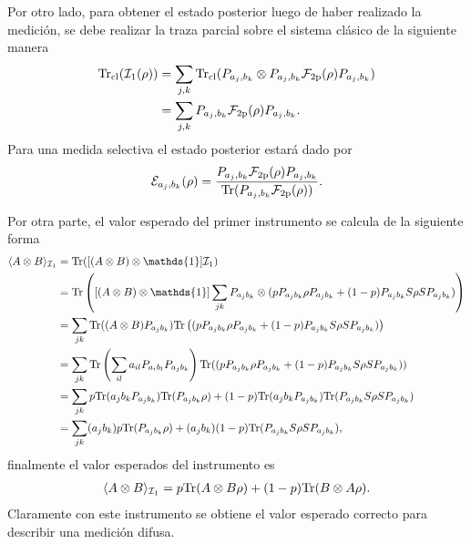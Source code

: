 Por otro lado, para obtener el estado posterior luego de haber realizado la medición, se debe realizar la traza parcial sobre el sistema clásico de la siguiente manera
\begin{equation}\label{eq:traza_cl_1instrument2p}
    \begin{split}
      {\rm Tr}_{\text{cl}}(\mathcal{I}_1{(\rho)})&=\sum_{j,k}{\rm Tr}_{\text{cl}}(P_{a_j,b_k}\otimes P_{a_j,b_k} \mathcal{F}_{2\text{p}}(\rho) P_{a_j,b_k})\\
    &=\sum_{j,k}P_{a_j,b_k} \mathcal{F}_{2\text{p}}(\rho) P_{a_j,b_k}.
\end{split}
\end{equation}Para una medida selectiva el estado posterior estará dado por
\[\mathcal{E}_{a_j,b_k}(\rho)=\dfrac{P_{a_j,b_k} \mathcal{F}_{2\text{p}}(\rho) P_{a_j,b_k}}{{\rm Tr}(P_{a_j,b_k} \mathcal{F}_{2\text{p}}(\rho))}.\]



Por otra parte, el valor esperado del primer instrumento se calcula de la siguiente forma \begin{equation*}
    \begin{split}
        \la A\otimes B \ra_{\mathcal{I}_1}&=\tr([(A\otimes B) \otimes \mathds{1}]\mathcal{I}_1) \\
        &=\tr\left([(A\otimes B) \otimes \mathds{1}]\sum_{jk}P_{a_j b_k}\otimes (pP_{a_j b_k}\rho P_{a_j b_k}+ (1-p)P_{a_j b_k}S\rho S P_{a_j b_k})\right)\\
        &=\sum_{jk} \tr((A\otimes B) P_{a_j b_k}) \tr\left((pP_{a_j b_k}\rho P_{a_j b_k}+ (1-p)P_{a_j b_k}S\rho S P_{a_j b_k})\right) \\
        &=\sum_{jk} \tr\left(\sum_{il}a_{il}P_{a_i b_l} P_{a_j b_k}\right) \tr((pP_{a_j b_k}\rho P_{a_j b_k}+ (1-p)P_{a_j b_k}S\rho S P_{a_j b_k})) \\
        &=\sum_{jk} p\tr(a_{j}b_k P_{a_j b_k}) \tr(P_{a_j b_k}\rho)+ (1-p)\tr(a_{j}b_k P_{a_j b_k})\tr(P_{a_j b_k}S\rho S P_{a_j b_k}) \\
        &=\sum_{jk}  (a_{j}b_k)p  \tr(P_{a_j b_k}\rho)+(a_{j}b_k) (1-p) \tr(P_{a_j b_k}S\rho S P_{a_j b_k}),\\
    \end{split}
\end{equation*}  finalmente el valor esperados del instrumento es \begin{equation}\label{eq:expectedValueFirstInstrument2p}
    \begin{split}
        \langle A\otimes B \rangle_{\mathcal{I}_1}&=p {\rm Tr}(A\otimes B \rho)+ (1-p){\rm Tr}(B\otimes A \rho ). \\
    \end{split}
\end{equation} Claramente con este instrumento se obtiene el valor esperado correcto para describir una medición difusa.


